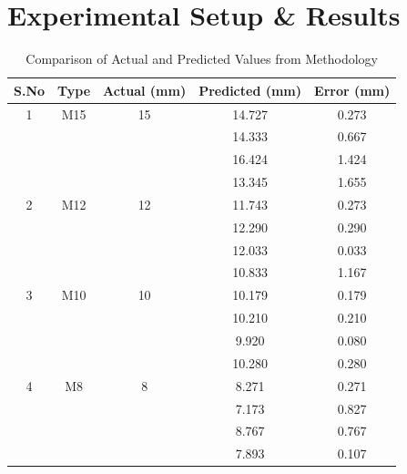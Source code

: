 \documentclass[letterpaper, 10 pt, conference]{ieeeconf}  %
\begin{document}
\section{Experimental Setup \& Results}
\begin{table}[htbp]
\caption{Comparison of Actual and Predicted Values from Methodology}
\begin{center}
\renewcommand{\arraystretch}{1.2} %
\begin{tabular}{|c|c|c|c|c|}
    \hline
    \textbf{S.No} & \textbf{Type} & \textbf{Actual (mm)} & \textbf{Predicted (mm)} & \textbf{Error (mm)}\\ 
    \hline
    1 & M15 & 15 & 14.727 & 0.273\\
      &    &    & 14.333 & 0.667\\
      &    &    & 16.424 & 1.424\\
      &    &    & 13.345 & 1.655\\
    \hline
    \hline
    2 & M12 & 12 & 11.743 & 0.273\\
      &    &    & 12.290 & 0.290\\
      &    &    & 12.033 & 0.033\\
      &    &    & 10.833 & 1.167\\
    \hline
    \hline
    3 & M10 & 10 & 10.179 & 0.179\\
      &    &    & 10.210 & 0.210\\
      &    &    & 9.920 & 0.080\\
      &    &    & 10.280 & 0.280\\
    \hline
    \hline
    4 & M8  & 8  & 8.271 & 0.271\\
      &    &    & 7.173 & 0.827\\
      &    &    & 8.767 & 0.767\\
      &    &    & 7.893 & 0.107\\
    \hline
  \end{tabular}
\label{Table2}
\end{center}
\end{table}
\end{document}
